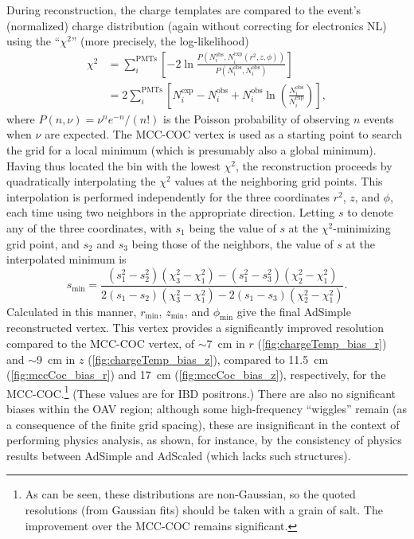 \documentclass[../thesis.tex]{subfiles}
\begin{document}
\newcommand\Niobs{N_i^{\mathrm{obs}}}
\newcommand\Niexp{N_i^{\mathrm{exp}}}

During reconstruction, the charge templates are compared to the event's (normalized) charge distribution (again without correcting for electronics NL) using the ``$\chi^2$'' (more precisely, the log-likelihood)
\begin{align*}
  \chi^2 &= \sum_i^{\mathrm{PMTs}}\left[ -2 \ln \frac{P(\Niobs, \Niexp(r^2, z, \phi))}
        {P(\Niobs, \Niobs)} \right] \\
      &= 2 \sum_i^{\mathrm{PMTs}} \left[ \Niexp - \Niobs+ \Niobs \ln \left( \frac{\Niobs}{\Niexp} \right) \right],
\end{align*}
where $P(n, \nu) = \nu^n e^{-n} / (n!)$ is the Poisson probability of observing $n$ events when $\nu$ are expected. The MCC-COC vertex is used as a starting point to search the grid for a local minimum (which is presumably also a global minimum). Having thus located the bin with the lowest $\chi^2$, the reconstruction proceeds by quadratically interpolating the $\chi^2$ values at the neighboring grid points. This interpolation is performed independently for the three coordinates $r^2$, $z$, and $\phi$, each time using two neighbors in the appropriate direction. Letting $s$ to denote any of the three coordinates, with $s_1$ being the value of $s$ at the $\chi^2$-minimizing grid point, and $s_2$ and $s_3$ being those of the neighbors, the value of $s$ at the interpolated minimum is
\begin{equation}
  s_{\mathrm{min}} = \frac{(s_1^2 - s_2^2)(\chi_3^2 - \chi_1^2) - (s_1^2 - s_3^2)(\chi_2^2 - \chi_1^2)}{2(s_1 - s_2)(\chi_3^2 - \chi_1^2) - 2(s_1 - s_3)(\chi_2^2 - \chi_1^2)}.
\end{equation}
Calculated in this manner, $r_{\mathrm{min}}$, $z_{\mathrm{min}}$, and $\phi_{\mathrm{min}}$ give the final AdSimple reconstructed vertex. This vertex provides a significantly improved resolution compared to the MCC-COC vertex, of $\sim$7~cm in $r$ (\autoref{fig:chargeTemp_bias_r}) and $\sim$9~cm in $z$ (\autoref{fig:chargeTemp_bias_z}), compared to 11.5~cm (\autoref{fig:mccCoc_bias_r}) and 17~cm (\autoref{fig:mccCoc_bias_z}), respectively, for the MCC-COC.\footnote{As can be seen, these distributions are non-Gaussian, so the quoted resolutions (from Gaussian fits) should be taken with a grain of salt. The improvement over the MCC-COC remains significant.} (These values are for IBD positrons.) There are also no significant biases within the OAV region; although some high-frequency ``wiggles'' remain (as a consequence of the finite grid spacing), these are insignificant in the context of performing physics analysis, as shown, for instance, by the consistency of physics results between AdSimple and AdScaled (which lacks such structures).
\end{document}
